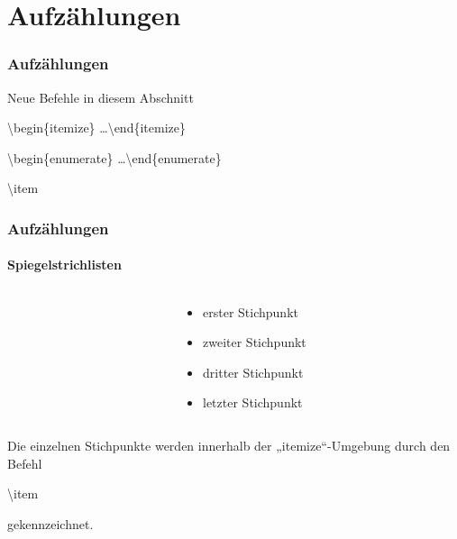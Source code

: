 \section{Aufz\"ahlungen}
\begin{frame}
\frametitle{Aufzählungen}

\begin{block}{Neue Befehle in diesem Abschnitt}
\begin{itemize}
\begin{ttfamily}
\item \color{unibablueI}\textbackslash begin\color{black}\{itemize\} \ldots \color{unibablueI}\textbackslash end\color{black}\{itemize\} 
\item \color{unibablueI}\textbackslash begin\color{black}\{enumerate\} \ldots \color{unibablueI}\textbackslash end\color{black}\{enumerate\} 
\item \color{nounibaredI}\textbackslash item\color{black}%
\end{ttfamily}
\end{itemize}
\end{block}
\end{frame}

\begin{frame}
\frametitle{Aufzählungen}
\framesubtitle{Spiegelstrichlisten}

\begin{columns}
\begin{column}{.5\textwidth}
\begin{ttfamily}%

\end{ttfamily}
\end{column}
\begin{column}{.5\textwidth}
\begin{itemize}
\item erster Stichpunkt
\item zweiter Stichpunkt
\item dritter Stichpunkt
\item letzter Stichpunkt
\end{itemize}
\end{column}
\end{columns}
\bigskip

Die einzelnen Stichpunkte werden innerhalb der „itemize“-Umgebung durch den Befehl \begin{ttfamily}\color{nounibaredI}\textbackslash item\color{black}\end{ttfamily} gekennzeichnet.
\end{frame}

